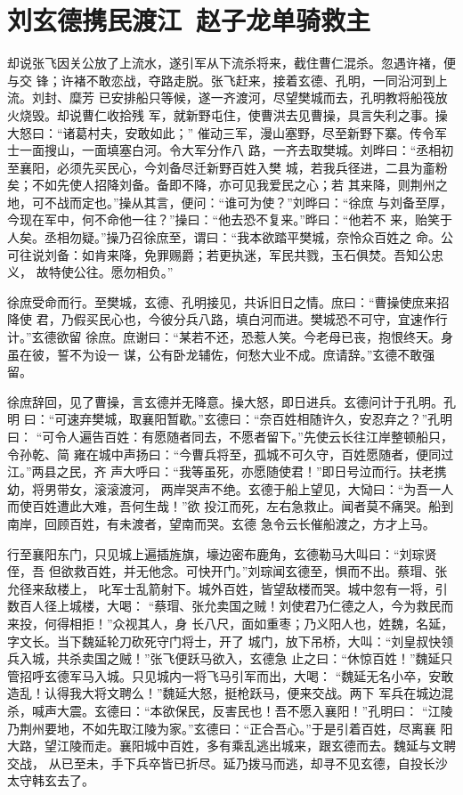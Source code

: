 \chapter{刘玄德携民渡江~赵子龙单骑救主}

却说张飞因关公放了上流水，遂引军从下流杀将来，截住曹仁混杀。忽遇许褚，便与交
锋；许褚不敢恋战，夺路走脱。张飞赶来，接着玄德、孔明，一同沿河到上流。刘封、糜芳
已安排船只等候，遂一齐渡河，尽望樊城而去，孔明教将船筏放火烧毁。却说曹仁收拾残
军，就新野屯住，使曹洪去见曹操，具言失利之事。操大怒曰：“诸葛村夫，安敢如此；”
催动三军，漫山塞野，尽至新野下寨。传令军士一面搜山，一面填塞白河。令大军分作八
路，一齐去取樊城。刘晔曰：“丞相初至襄阳，必须先买民心，今刘备尽迁新野百姓入樊
城，若我兵径进，二县为齑粉矣；不如先使人招降刘备。备即不降，亦可见我爱民之心；若
其来降，则荆州之地，可不战而定也。”操从其言，便问：“谁可为使？”刘晔曰：“徐庶
与刘备至厚，今现在军中，何不命他一往？”操曰：“他去恐不复来。”晔曰：“他若不
来，贻笑于人矣。丞相勿疑。”操乃召徐庶至，谓曰：“我本欲踏平樊城，奈怜众百姓之
命。公可往说刘备：如肯来降，免罪赐爵；若更执迷，军民共戮，玉石俱焚。吾知公忠义，
故特使公往。愿勿相负。”

徐庶受命而行。至樊城，玄德、孔明接见，共诉旧日之情。庶曰：“曹操使庶来招降使
君，乃假买民心也，今彼分兵八路，填白河而进。樊城恐不可守，宜速作行计。”玄德欲留
徐庶。庶谢曰：“某若不还，恐惹人笑。今老母已丧，抱恨终天。身虽在彼，誓不为设一
谋，公有卧龙辅佐，何愁大业不成。庶请辞。”玄德不敢强留。

徐庶辞回，见了曹操，言玄德并无降意。操大怒，即日进兵。玄德问计于孔明。孔明
曰：“可速弃樊城，取襄阳暂歇。”玄德曰：“奈百姓相随许久，安忍弃之？”孔明曰：
“可令人遍告百姓：有愿随者同去，不愿者留下。”先使云长往江岸整顿船只，令孙乾、简
雍在城中声扬曰：“今曹兵将至，孤城不可久守，百姓愿随者，便同过江。”两县之民，齐
声大呼曰：“我等虽死，亦愿随使君！”即日号泣而行。扶老携幼，将男带女，滚滚渡河，
两岸哭声不绝。玄德于船上望见，大恸曰：“为吾一人而使百姓遭此大难，吾何生哉！”欲
投江而死，左右急救止。闻者莫不痛哭。船到南岸，回顾百姓，有未渡者，望南而哭。玄德
急令云长催船渡之，方才上马。

行至襄阳东门，只见城上遍插旌旗，壕边密布鹿角，玄德勒马大叫曰：“刘琮贤侄，吾
但欲救百姓，并无他念。可快开门。”刘琮闻玄德至，惧而不出。蔡瑁、张允径来敌楼上，
叱军士乱箭射下。城外百姓，皆望敌楼而哭。城中忽有一将，引数百人径上城楼，大喝：
“蔡瑁、张允卖国之贼！刘使君乃仁德之人，今为救民而来投，何得相拒！”众视其人，身
长八尺，面如重枣；乃义阳人也，姓魏，名延，字文长。当下魏延轮刀砍死守门将士，开了
城门，放下吊桥，大叫：“刘皇叔快领兵入城，共杀卖国之贼！”张飞便跃马欲入，玄德急
止之曰：“休惊百姓！”魏延只管招呼玄德军马入城。只见城内一将飞马引军而出，大喝：
“魏延无名小卒，安敢造乱！认得我大将文聘么！”魏延大怒，挺枪跃马，便来交战。两下
军兵在城边混杀，喊声大震。玄德曰：“本欲保民，反害民也！吾不愿入襄阳！”孔明曰：
“江陵乃荆州要地，不如先取江陵为家。”玄德曰：“正合吾心。”于是引着百姓，尽离襄
阳大路，望江陵而走。襄阳城中百姓，多有乘乱逃出城来，跟玄德而去。魏延与文聘交战，
从已至未，手下兵卒皆已折尽。延乃拨马而逃，却寻不见玄德，自投长沙太守韩玄去了。

